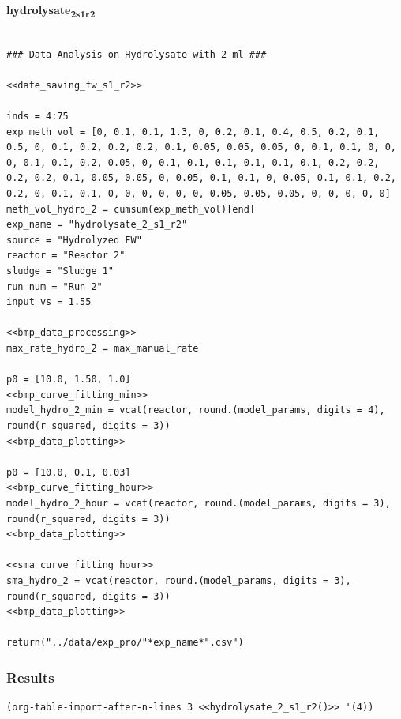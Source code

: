 \documentclass[11pt]{article}
\begin{document}
\textbf{hydrolysate\textsubscript{2}\textsubscript{s1}\textsubscript{r2}}
\begin{verbatim}

### Data Analysis on Hydrolysate with 2 ml ###

<<date_saving_fw_s1_r2>>

inds = 4:75
exp_meth_vol = [0, 0.1, 0.1, 1.3, 0, 0.2, 0.1, 0.4, 0.5, 0.2, 0.1, 0.5, 0, 0.1, 0.2, 0.2, 0.2, 0.1, 0.05, 0.05, 0.05, 0, 0.1, 0.1, 0, 0, 0, 0.1, 0.1, 0.2, 0.05, 0, 0.1, 0.1, 0.1, 0.1, 0.1, 0.1, 0.2, 0.2, 0.2, 0.2, 0.1, 0.05, 0.05, 0, 0.05, 0.1, 0.1, 0, 0.05, 0.1, 0.1, 0.2, 0.2, 0, 0.1, 0.1, 0, 0, 0, 0, 0, 0, 0.05, 0.05, 0.05, 0, 0, 0, 0, 0]
meth_vol_hydro_2 = cumsum(exp_meth_vol)[end]
exp_name = "hydrolysate_2_s1_r2"
source = "Hydrolyzed FW"
reactor = "Reactor 2"
sludge = "Sludge 1"
run_num = "Run 2"
input_vs = 1.55

<<bmp_data_processing>>
max_rate_hydro_2 = max_manual_rate

p0 = [10.0, 1.50, 1.0]
<<bmp_curve_fitting_min>>
model_hydro_2_min = vcat(reactor, round.(model_params, digits = 4), round(r_squared, digits = 3))
<<bmp_data_plotting>>

p0 = [10.0, 0.1, 0.03]
<<bmp_curve_fitting_hour>>
model_hydro_2_hour = vcat(reactor, round.(model_params, digits = 3), round(r_squared, digits = 3))
<<bmp_data_plotting>>

<<sma_curve_fitting_hour>>
sma_hydro_2 = vcat(reactor, round.(model_params, digits = 3), round(r_squared, digits = 3))
<<bmp_data_plotting>>

return("../data/exp_pro/"*exp_name*".csv")
\end{verbatim}

\subsubsection{Results}
\label{sec:orgc6f6a3e}

\begin{verbatim}
(org-table-import-after-n-lines 3 <<hydrolysate_2_s1_r2()>> '(4))
\end{verbatim}
\end{document}
